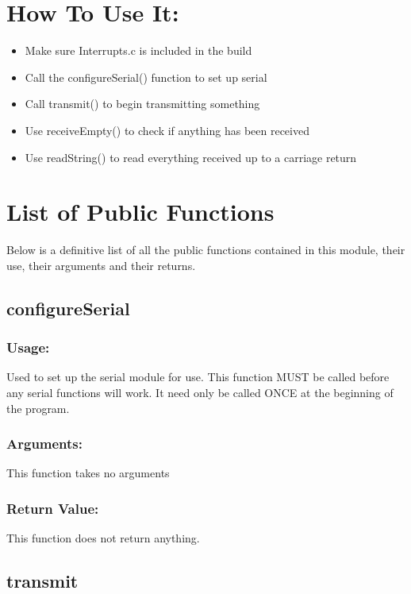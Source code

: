 \documentclass[]{report}
\begin{document}
\section{How To Use It:}
\begin{itemize}
	\item Make sure Interrupts.c is included in the build
	\item Call the configureSerial() function to set up serial
	\item Call transmit() to begin transmitting something
	\item Use receiveEmpty() to check if anything has been received
	\item Use readString() to read everything received up to a carriage return
\end{itemize}

\section{List of Public Functions}
Below is a definitive list of all the public functions contained in this module, their use, their arguments and their returns.

\subsection{configureSerial}
\subsubsection{Usage:}
Used to set up the serial module for use. This function MUST be called before any serial functions will work. It need only be called ONCE at the beginning of the program.

\subsubsection{Arguments:}
This function takes no arguments

\subsubsection{Return Value:}
This function does not return anything.

\subsection{transmit}
\end{document}
